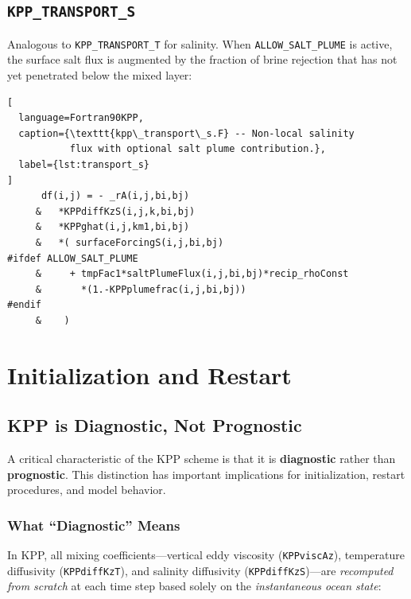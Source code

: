 \documentclass[12pt,letterpaper]{article}
\begin{document}
\subsection{\texttt{KPP\_TRANSPORT\_S}}  
  
Analogous to \texttt{KPP\_TRANSPORT\_T} for salinity. When  
\texttt{ALLOW\_SALT\_PLUME} is active, the surface salt flux is  
augmented by the fraction of brine rejection that has not yet  
penetrated below the mixed layer:  
  
\begin{lstlisting}[  
  language=Fortran90KPP,  
  caption={\texttt{kpp\_transport\_s.F} -- Non-local salinity  
           flux with optional salt plume contribution.},  
  label={lst:transport_s}  
]  
      df(i,j) = - _rA(i,j,bi,bj)  
     &   *KPPdiffKzS(i,j,k,bi,bj)  
     &   *KPPghat(i,j,km1,bi,bj)  
     &   *( surfaceForcingS(i,j,bi,bj)  
#ifdef ALLOW_SALT_PLUME  
     &     + tmpFac1*saltPlumeFlux(i,j,bi,bj)*recip_rhoConst  
     &       *(1.-KPPplumefrac(i,j,bi,bj))  
#endif  
     &    )  
\end{lstlisting}  
  
\section{Initialization and Restart}
\label{sec:init_restart}

\subsection{KPP is Diagnostic, Not Prognostic}

A critical characteristic of the KPP scheme is that it is \textbf{diagnostic}
rather than \textbf{prognostic}. This distinction has important implications
for initialization, restart procedures, and model behavior.

\subsubsection{What ``Diagnostic'' Means}

In KPP, all mixing coefficients---vertical eddy viscosity (\texttt{KPPviscAz}),
temperature diffusivity (\texttt{KPPdiffKzT}), and salinity diffusivity
(\texttt{KPPdiffKzS})---are \textit{recomputed from scratch} at each time
step based solely on the \textit{instantaneous ocean state}:
\end{document}
